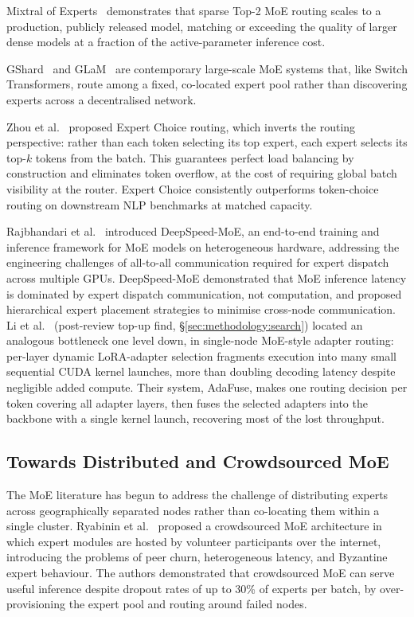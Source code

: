 Mixtral of Experts~\cite{JiangMixtral2024} demonstrates that sparse Top-2 MoE routing scales to a production, publicly released model, matching or exceeding the quality of larger dense models at a fraction of the active-parameter inference cost.

GShard~\cite{LepikhinGShard2021} and GLaM~\cite{DuGLaM2022} are contemporary large-scale MoE systems that, like Switch Transformers, route among a fixed, co-located expert pool rather than discovering experts across a decentralised network.

Zhou et al.~\cite{Zhou2022} proposed Expert Choice routing, which inverts the routing perspective:
rather than each token selecting its top expert, each expert selects its top-$k$ tokens
from the batch. This guarantees perfect load balancing by construction and eliminates
token overflow, at the cost of requiring global batch visibility at the router.
Expert Choice consistently outperforms token-choice routing on downstream NLP benchmarks
at matched capacity.

Rajbhandari et al.~\cite{RajbhandariDeepSpeed2022} introduced DeepSpeed-MoE, an end-to-end training and
inference framework for MoE models on heterogeneous hardware, addressing the engineering
challenges of all-to-all communication required for expert dispatch across multiple GPUs.
DeepSpeed-MoE demonstrated that MoE inference latency is dominated by expert dispatch
communication, not computation, and proposed hierarchical expert placement strategies
to minimise cross-node communication. Li et al.~\cite{LiAdaFuse2026} (post-review
top-up find, \S\ref{sec:methodology:search}) located an analogous bottleneck one
level down, in single-node MoE-style adapter routing: per-layer dynamic
LoRA-adapter selection fragments execution into many small sequential CUDA
kernel launches, more than doubling decoding latency despite negligible added
compute. Their system, AdaFuse, makes one routing decision per token covering
all adapter layers, then fuses the selected adapters into the backbone with a
single kernel launch, recovering most of the lost throughput.

\subsection{Towards Distributed and Crowdsourced MoE}
\label{sec:moe_routing:distributed}

The MoE literature has begun to address the challenge of distributing experts across
geographically separated nodes rather than co-locating them within a single cluster.
Ryabinin et al.~\cite{RyabininCrowdsourced2020} proposed a crowdsourced MoE architecture in which
expert modules are hosted by volunteer participants over the internet, introducing
the problems of peer churn, heterogeneous latency, and Byzantine expert behaviour.
The authors demonstrated that crowdsourced MoE can serve useful inference despite
dropout rates of up to 30\% of experts per batch, by over-provisioning the expert
pool and routing around failed nodes.

